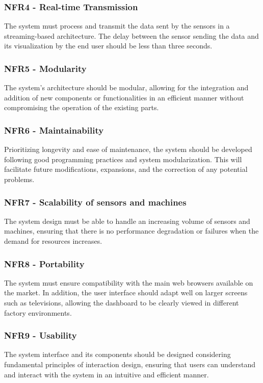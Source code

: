 \subsubsection{NFR4 - Real-time Transmission}
The system must process and transmit the data sent by the sensors in a streaming-based architecture. The delay between the sensor sending the data and its visualization by the end user should be less than three seconds.

\subsubsection{NFR5 - Modularity}
The system's architecture should be modular, allowing for the integration and addition of new components or functionalities in an efficient manner without compromising the operation of the existing parts.

\subsubsection{NFR6 - Maintainability}
Prioritizing longevity and ease of maintenance, the system should be developed following good programming practices and system modularization. This will facilitate future modifications, expansions, and the correction of any potential problems.

\subsubsection{NFR7 - Scalability of sensors and machines}
The system design must be able to handle an increasing volume of sensors and machines, ensuring that there is no performance degradation or failures when the demand for resources increases.

\subsubsection{NFR8 - Portability}
The system must ensure compatibility with the main web browsers available on the market. In addition, the user interface should adapt well on larger screens such as televisions, allowing the dashboard to be clearly viewed in different factory environments.

\subsubsection{NFR9 - Usability}The system interface and its components should be designed considering fundamental principles of interaction design, ensuring that users can understand and interact with the system in an intuitive and efficient manner.

